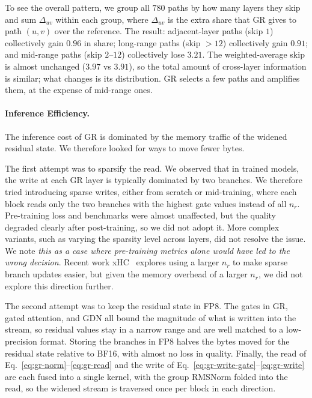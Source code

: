 To see the overall pattern, we group all $780$ paths by how many layers they skip and sum $\Delta_{uv}$ within each group, where $\Delta_{uv}$ is the extra share that GR gives to path $(u,v)$ over the reference. 
The result: adjacent-layer paths (skip $1$) collectively gain $0.96$ in share; long-range paths (skip $>12$) collectively gain $0.91$; and mid-range paths
(skip $2$--$12$) collectively lose $3.21$. The weighted-average skip is almost unchanged ($3.97$ vs $3.91$), so the total amount of cross-layer information is similar; what changes is its distribution. 
GR selects a few paths and amplifies them, at the expense of mid-range ones.

\paragraph{Inference Efficiency.}
\label{sec:residual-efficiency}
The inference cost of GR is dominated by the memory traffic of the widened residual state. We therefore looked for ways to move fewer bytes.

The first attempt was to sparsify the read. We observed that in trained models, the write at each GR layer is typically dominated by two branches.
We therefore tried introducing sparse writes, either from scratch or mid-training, where each block reads only the two branches with the highest gate values instead of all $n_r$. 
Pre-training loss and benchmarks were almost unaffected, but the quality degraded clearly after post-training, so we did not adopt it. 
More complex variants, such as varying the sparsity level across layers, did not resolve the issue. 
We note \textit{this as a case where pre-training metrics alone would have led to the wrong decision}. 
Recent work xHC~\citep{zhang2026xhc} explores using a larger $n_r$ to make sparse branch updates easier, but given the memory overhead of a larger $n_r$, we did not explore this direction further.

The second attempt was to keep the residual state in FP8. The gates in GR, gated attention, and GDN all bound the magnitude of what is written into the stream, so residual values stay in a narrow range and are well matched to a low-precision format. 
Storing the branches in FP8 halves the bytes moved for the residual state relative to BF16, with almost no loss in quality.
Finally, the read of Eq.~\eqref{eq:gr-norm}--\eqref{eq:gr-read} and the write of Eq.~\eqref{eq:gr-write-gate}--\eqref{eq:gr-write} are each fused into a single kernel, with the group RMSNorm folded into the read, so the
widened stream is traversed once per block in each direction.